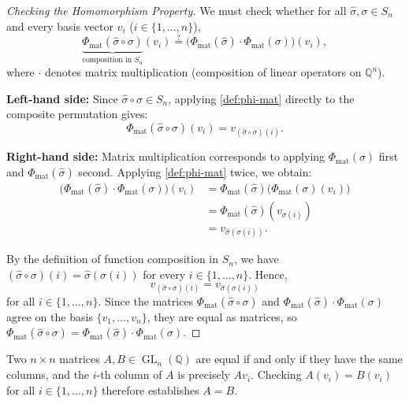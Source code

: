 \begin{content}

\begin{proof}[Checking the Homomorphism Property]
We must check whether for all $\hat{\sigma}, \sigma \in S_n$ and every basis vector $v_i$ ($i \in \{1, \dots, n\}$),
\[
\underbrace{\Phi_{\text{mat}}(\hat{\sigma} \circ \sigma)}_{\text{composition in } S_n}(v_i) \stackrel{?}{=} \bigl(\Phi_{\text{mat}}(\hat{\sigma}) \cdot \Phi_{\text{mat}}(\sigma)\bigr)(v_i),
\]
where $\cdot$ denotes matrix multiplication (composition of linear operators on $\mathbb{Q}^n$).

\textbf{Left-hand side:} Since $\hat{\sigma} \circ \sigma \in S_n$, applying \cref{def:phi-mat} directly to the composite permutation gives:
\[
\Phi_{\text{mat}}(\hat{\sigma} \circ \sigma)(v_i) = v_{(\hat{\sigma} \circ \sigma)(i)}.
\]

\textbf{Right-hand side:} Matrix multiplication corresponds to applying $\Phi_{\text{mat}}(\sigma)$ first and $\Phi_{\text{mat}}(\hat{\sigma})$ second. Applying \cref{def:phi-mat} twice, we obtain:
\begin{align*}
\bigl(\Phi_{\text{mat}}(\hat{\sigma}) \cdot \Phi_{\text{mat}}(\sigma)\bigr)(v_i)
&= \Phi_{\text{mat}}(\hat{\sigma})\bigl(\Phi_{\text{mat}}(\sigma)(v_i)\bigr) \\
&= \Phi_{\text{mat}}(\hat{\sigma})(v_{\sigma(i)}) \\
&= v_{\hat{\sigma}(\sigma(i))}.
\end{align*}

By the definition of function composition in $S_n$, we have $(\hat{\sigma} \circ \sigma)(i) = \hat{\sigma}(\sigma(i))$ for every $i \in \{1, \dots, n\}$. Hence,
\[
v_{(\hat{\sigma} \circ \sigma)(i)} = v_{\hat{\sigma}(\sigma(i))}
\]
for all $i \in \{1, \dots, n\}$. Since the matrices $\Phi_{\text{mat}}(\hat{\sigma} \circ \sigma)$ and $\Phi_{\text{mat}}(\hat{\sigma}) \cdot \Phi_{\text{mat}}(\sigma)$ agree on the basis $\{v_1, \dots, v_n\}$, they are equal as matrices, so $\Phi_{\text{mat}}(\hat{\sigma} \circ \sigma) = \Phi_{\text{mat}}(\hat{\sigma}) \cdot \Phi_{\text{mat}}(\sigma)$.
\end{proof}

\begin{steps}
Two $n \times n$ matrices $A, B \in \operatorname{GL}_n(\mathbb{Q})$ are equal if and only if they have the same columns, and the $i$-th column of $A$ is precisely $A v_i$. Checking $A(v_i) = B(v_i)$ for all $i \in \{1, \dots, n\}$ therefore establishes $A = B$.
\end{steps}
\end{content}


